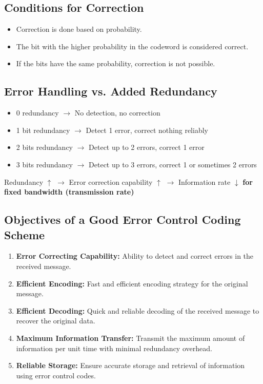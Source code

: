 \documentclass[11pt,a4paper]{book}
\newenvironment{infobox}[1][Information]{
    \begin{tcolorbox}[
        enhanced,
        breakable,
        colback=mintgreen!10,
        colframe=mintgreen!200,
        title=#1,
        fonttitle=\bfseries,
        sharp corners,
        boxrule=0.8pt,
        left=8pt,
        right=8pt,
        top=6pt,
        bottom=6pt
    ]
}{
    \end{tcolorbox}
}
\begin{document}
\subsection{Conditions for Correction}
\begin{itemize}
    \item Correction is done based on probability.
    \item The bit with the higher probability in the codeword is considered correct.
    \item If the bits have the same probability, correction is not possible.
\end{itemize}

\subsection{Error Handling vs. Added Redundancy}
\begin{itemize}
    \item 0 redundancy $\to$ No detection, no correction
    \item 1 bit redundancy $\to$ Detect 1 error, correct nothing reliably
    \item 2 bits redundancy $\to$ Detect up to 2 errors, correct 1 error
    \item 3 bits redundancy $\to$ Detect up to 3 errors, correct 1 or sometimes 2 errors
\end{itemize}

\begin{infobox}[Error Handling vs. Added Redundancy]
    Redundancy $\uparrow$ $\rightarrow$  Error correction capability $\uparrow$ $\rightarrow$ Information rate $\downarrow$ \textbf{for fixed bandwidth (transmission rate)}
\end{infobox}

\subsection{Objectives of a Good Error Control Coding Scheme}
\begin{enumerate}
    \item \textbf{Error Correcting Capability:} Ability to detect and correct errors in the received message.
    \item \textbf{Efficient Encoding:} Fast and efficient encoding strategy for the original message.
    \item \textbf{Efficient Decoding:} Quick and reliable decoding of the received message to recover the original data.
    \item \textbf{Maximum Information Transfer:} Transmit the maximum amount of information per unit time with minimal redundancy overhead.
    \item \textbf{Reliable Storage:} Ensure accurate storage and retrieval of information using error control codes.
\end{enumerate}
\end{document}
